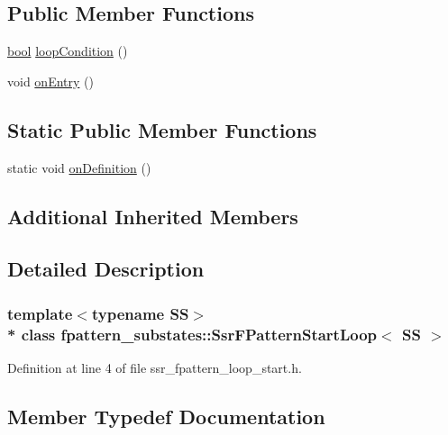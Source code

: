 \subsection*{Public Member Functions}
\begin{DoxyCompactItemize}
\item 
\hyperlink{classbool}{bool} \hyperlink{structfpattern__substates_1_1SsrFPatternStartLoop_ad2f12b54210a5cd30ac057a95bf35dfa}{loop\+Condition} ()
\item 
void \hyperlink{structfpattern__substates_1_1SsrFPatternStartLoop_a1ca1074216b7cfab24edb75602ad070a}{on\+Entry} ()
\end{DoxyCompactItemize}
\subsection*{Static Public Member Functions}
\begin{DoxyCompactItemize}
\item 
static void \hyperlink{structfpattern__substates_1_1SsrFPatternStartLoop_a4093b89bd43faa3ad5506ea87aa2ea07}{on\+Definition} ()
\end{DoxyCompactItemize}
\subsection*{Additional Inherited Members}


\subsection{Detailed Description}
\subsubsection*{template$<$typename SS$>$\\*
class fpattern\+\_\+substates\+::\+Ssr\+F\+Pattern\+Start\+Loop$<$ S\+S $>$}



Definition at line 4 of file ssr\+\_\+fpattern\+\_\+loop\+\_\+start.\+h.



\subsection{Member Typedef Documentation}
